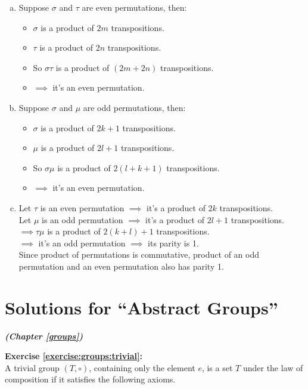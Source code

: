 \begin{enumerate}[(a)]
\item
Suppose $\sigma$ and $\tau$ are even permutations, then:
\begin{itemize}
\item
$\sigma$ is a product of $2m$ transpositions.
\item
$\tau$ is a product of $2n$ transpositions.
\item
So $\sigma\tau$ is a product of $(2m+2n)$ transpositions.
\item
$\implies$  it's an even permutation.
\end{itemize}
\item
 Suppose $\sigma$ and $\mu$ are odd permutations, then:
\begin{itemize}
\item
$\sigma$ is a product of $2k+1$ transpositions.
\item
$\mu$ is a product of $2l+1$ transpositions.
\item
So $\sigma\mu$ is a product of $2(l+k+1)$ transpositions.
\item
$\implies$  it's an even permutation.
\end{itemize}
\item
 Let $\tau$ is an even permutation $\implies$  it's a product of $2k$ transpositions.\\
Let $\mu$ is an odd permutation $\implies$  it's a product of $2l+1$ transpositions.\\
$\implies \tau\mu$ is a product of $2(k+l)+1$ transpositions.\\
$\implies$  it's an odd permutation $\implies$  its parity is 1.\\
Since product of permutations is commutative, product of an odd permutation and an even permutation also has parity 1.\\
\end{enumerate}

\section{Solutions for  ``Abstract Groups''}
\noindent\textbf{\textit{ (Chapter \ref{groups})}}\bigskip

\noindent\textbf{Exercise \ref{exercise:groups:trivial}:}\\
A trivial group $(T, \circ )$, containing only the element $e$, is a set $T$ under the law of composition if it satisfies the following axioms. 

